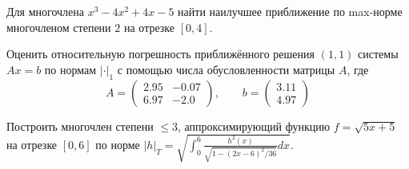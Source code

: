 \newpage


\newpage
\begin{problem}
    Для многочлена $x^3 - 4x^2 + 4x - 5$ найти наилучшее приближение по
    max-норме многочленом степени $2$ на отрезке $[0, 4]$.
\end{problem}


\begin{problem}
    Оценить относительную погрешность приближённого решения $(1, 1)$ системы
    $Ax = b$ по нормам $|\cdot|_1$ с помощью числа обусловленности матрицы
    $A$, где
    \begin{equation*}
        A =
        \begin{pmatrix}
            2.95 & -0.07\\
            6.97 & -2.0
        \end{pmatrix}
        , \qquad b =
        \begin{pmatrix}
            3.11\\
            4.97
        \end{pmatrix}
    \end{equation*}
\end{problem}


\begin{problem}
    Построить многочлен степени $\leq 3$, аппроксимирующий функцию
    $f = \sqrt{5x + 5}$ на отрезке $[0, 6]$ по норме
    $|h|_T = \sqrt{\int_0^6{
        \frac{h^2(x)}{\sqrt{1 - (2x - 6)^2/36}}
        dx
    }}$.
\end{problem}